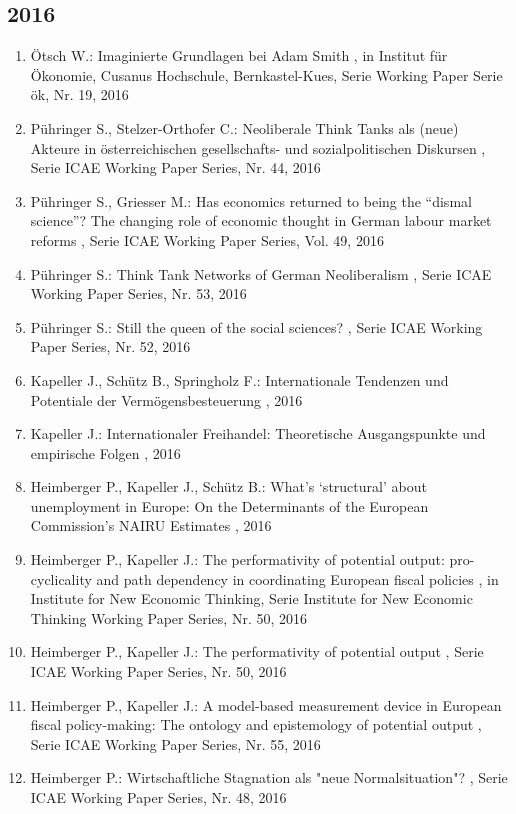  \subsection*{2016} 
 \begin{enumerate}[leftmargin=*, labelsep=0.5cm] 
	 \item Ötsch W.:  Imaginierte Grundlagen bei Adam Smith  , in Institut für Ökonomie, Cusanus Hochschule, Bernkastel-Kues, Serie Working Paper Serie ök, Nr. 19, 2016
	 \item Pühringer S., Stelzer-Orthofer C.:  Neoliberale Think Tanks als (neue) Akteure in österreichischen gesellschafts- und sozialpolitischen Diskursen  , Serie ICAE Working Paper Series, Nr. 44, 2016
	 \item Pühringer S., Griesser M.:  Has economics returned to being the “dismal science”? The changing role of economic thought in German labour market reforms  , Serie ICAE Working Paper Series, Vol. 49, 2016
	 \item Pühringer S.:  Think Tank Networks of German Neoliberalism  , Serie ICAE Working Paper Series, Nr. 53, 2016
	 \item Pühringer S.:  Still the queen of the social sciences?  , Serie ICAE Working Paper Series, Nr. 52, 2016
	 \item Kapeller J., Schütz B., Springholz F.:  Internationale Tendenzen und Potentiale der Vermögensbesteuerung  , 2016
	 \item Kapeller J.:  Internationaler Freihandel: Theoretische Ausgangspunkte und empirische Folgen  , 2016
	 \item Heimberger P., Kapeller J., Schütz B.:  What’s ‘structural’ about unemployment in Europe: On the Determinants of the European Commission’s NAIRU Estimates  , 2016
	 \item Heimberger P., Kapeller J.:  The performativity of potential output: pro-cyclicality and path dependency in coordinating European fiscal policies  , in Institute for New Economic Thinking, Serie Institute for New Economic Thinking  Working Paper Series, Nr. 50, 2016
	 \item Heimberger P., Kapeller J.:  The performativity of potential output  , Serie ICAE Working Paper Series, Nr. 50, 2016
	 \item Heimberger P., Kapeller J.:  A model-based measurement device in European fiscal policy-making: The ontology and epistemology of potential output  , Serie ICAE Working Paper Series, Nr. 55, 2016
	 \item Heimberger P.:  Wirtschaftliche Stagnation als "neue Normalsituation"?  , Serie ICAE Working Paper Series, Nr. 48, 2016

\end{enumerate}
